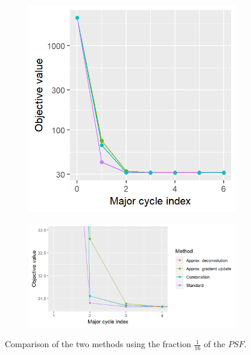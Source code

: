 \begin{figure}[h]
	\centering
	\begin{subfigure}[b]{0.33\linewidth}
		\includegraphics[width=\linewidth]{./chapters/10.results/gradient/comparison.png}
	\end{subfigure}
	\begin{subfigure}[b]{0.66\linewidth}
		\includegraphics[width=\linewidth]{./chapters/10.results/gradient/comparison_zoom.png}
	\end{subfigure}
	
	\caption{Comparison of the two methods using the fraction $\frac{1}{16}$ of the $PSF$.}
	\label{results:gradients:comparison:figure}
\end{figure}

